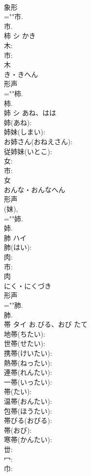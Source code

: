 \documentclass[8pt]{extreport}
\begin{document}
\begin{CJK}{UTF8}{min}
\\	象形 
\\	=""市.
\\	市.
\\	柿	シ	かき		
\\	木: 
\\	市: 
\\	木	
\\	き・きへん	
\\	形声 
\\	=""柿.
\\	柿.
\\	姉	シ	あね、はは		
\\	姉(あね): 
\\	姉妹(しまい): 
\\	お姉さん(おねえさん): 
\\	従姉妹(いとこ): 
\\	女: 
\\	市: 
\\	女	
\\	おんな・おんなへん	
\\	形声 
\\	(妹), 
\\	=""姉.
\\	姉.
\\	肺	ハイ			
\\	肺(はい): 
\\	肉: 
\\	市: 
\\	肉	
\\	にく・にくづき	
\\	形声 
\\	=""肺.
\\	肺.
\\	帯	タイ	お.びる、おび	たて	
\\	地帯(ちたい): 
\\	世帯(せたい): 
\\	携帯(けいたい): 
\\	熱帯(ねったい): 
\\	連帯(れんたい): 
\\	一帯(いったい): 
\\	帯(たい): 
\\	温帯(おんたい): 
\\	包帯(ほうたい): 
\\	帯びる(おびる): 
\\	帯(おび): 
\\	寒帯(かんたい): 
\\	丗: 
\\	冖: 
\\	巾: 

\end{CJK}
\end{document}
